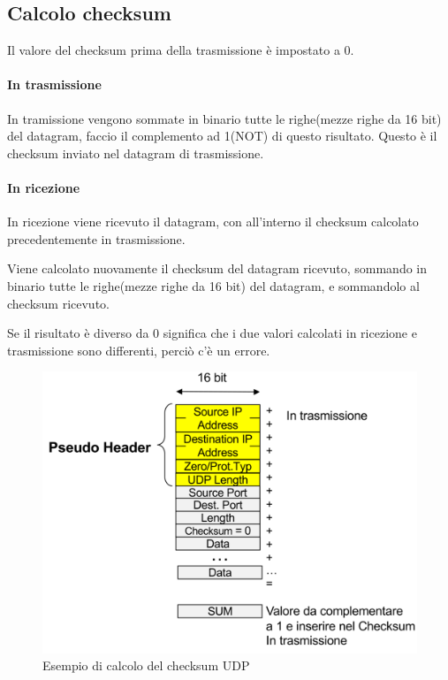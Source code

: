 \subsection{Calcolo checksum}
Il valore del checksum prima della trasmissione è impostato a 0.
 \paragraph{In trasmissione}
In tramissione vengono sommate in binario tutte le righe(mezze righe da 16 bit) del datagram, faccio il complemento ad 1(NOT) di questo risultato. Questo è il checksum inviato nel datagram di trasmissione.
\paragraph{In ricezione}
In ricezione viene ricevuto il datagram, con all'interno il checksum calcolato precedentemente in trasmissione. 

Viene calcolato nuovamente il checksum del datagram ricevuto, sommando in binario tutte le righe(mezze righe da 16 bit) del datagram, e sommandolo al checksum ricevuto. 

Se il risultato è diverso da 0 significa che i due valori calcolati in ricezione e trasmissione sono differenti, perciò c'è un errore.


\begin{figure}[h!]
    \centering
    \includegraphics[width=1\textwidth]{images/checksum_udp.png}
    \caption{Esempio di calcolo del checksum UDP}
    \label{fig:checksumudp}
\end{figure}

